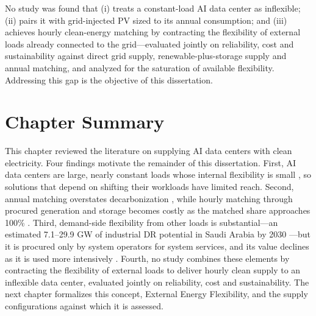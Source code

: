No study was found that (i) treats a constant-load AI data center as inflexible; (ii) pairs it with grid-injected PV sized to its annual consumption; and (iii) achieves hourly clean-energy matching by contracting the flexibility of external loads already connected to the grid---evaluated jointly on reliability, cost and sustainability against direct grid supply, renewable-plus-storage supply and annual matching, and analyzed for the saturation of available flexibility. Addressing this gap is the objective of this dissertation.

\section{Chapter Summary}\label{sec:2-14}

This chapter reviewed the literature on supplying AI data centers with clean electricity. Four findings motivate the remainder of this dissertation. First, AI data centers are large, nearly constant loads whose internal flexibility is small \cite{r1,r26,r40}, so solutions that depend on shifting their workloads have limited reach. Second, annual matching overstates decarbonization \cite{r10,r12,r13}, while hourly matching through procured generation and storage becomes costly as the matched share approaches 100\% \cite{r11,r15}. Third, demand-side flexibility from other loads is substantial---an estimated 7.1--29.9 GW of industrial DR potential in Saudi Arabia by 2030 \cite{r23}---but it is procured only by system operators for system services, and its value declines as it is used more intensively \cite{r23,r44}. Fourth, no study combines these elements by contracting the flexibility of external loads to deliver hourly clean supply to an inflexible data center, evaluated jointly on reliability, cost and sustainability. The next chapter formalizes this concept, External Energy Flexibility, and the supply configurations against which it is assessed.

